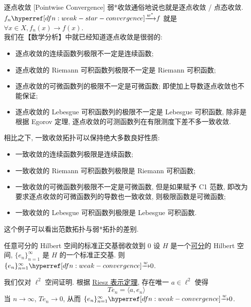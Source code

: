         \begin{ins}
            {逐点收敛}
            [Pointwise Convergence]
            弱*收敛通俗地说也就是逐点收敛 / 点态收敛. \(f_n\wslim f\) 就是 \(\forall x \in X, f_n(x) \to f(x)\).\\
            我们在【数学分析】中就已经知道逐点收敛是很弱的:
            \begin{itemize}
                \item 逐点收敛的连续函数列极限不一定是连续函数;
                \item 逐点收敛的 Riemann 可积函数列极限不一定是 Riemann 可积函数;
                \item 逐点收敛的可微函数列的极限不一定是可微函数; 即使加上导数逐点收敛也不能保证;
                \item 逐点收敛的 Lebesgue 可积函数列的极限不一定是 Lebesgue 可积函数, 除非是根据 Egorov 定理, 逐点收敛的可测函数列在有限测度下差不多一致收敛.
            \end{itemize}
            相比之下, 一致收敛拓扑可以保持绝大多数良好性质:
            \begin{itemize}
                \item 一致收敛的连续函数列极限是连续函数;
                \item 一致收敛的 Riemann 可积函数列极限是 Riemann 可积函数;
                \item 一致收敛的可微函数列极限不一定是可微函数, 但是如果赋予 C1 范数, 即改为要求逐点收敛的可微函数列的导数也一致收敛, 则极限函数是可微函数;
                \item 一致收敛的 Lebesgue 可积函数列极限是 Lebesgue 可积函数.
            \end{itemize}
            这个例子可以看出范数拓扑与弱*拓扑的差别.
        \end{ins}

        \begin{thm}
            {任意可分的 Hilbert 空间的标准正交基弱收敛到 0}
            设 \(H\) 是一个\hyperref[dfn:separable]{可分}的 Hilbert 空间, \(\{e_n\}_{n=1}^{\infty}\) 是 \(H\) 的一个标准正交基. 则 \(\{e_n\}_{n=1}^{\infty}\wlim 0\).
        \end{thm}

        \begin{prf}
            我们仅对 \(\ell^2\) 空间证明. 根据 \hyperref[thm:riesz-hilbert]{Riesz 表示定理}, 存在唯一 \(a\in\ell^2\) 使得
            \[T e_n = \langle a, e_n \rangle\]
            当 \(n\to\infty\), \(Te_n\to 0\), 从而 \(\{e_n\}_{n=1}^{\infty}\wlim 0\).
        \end{prf}

